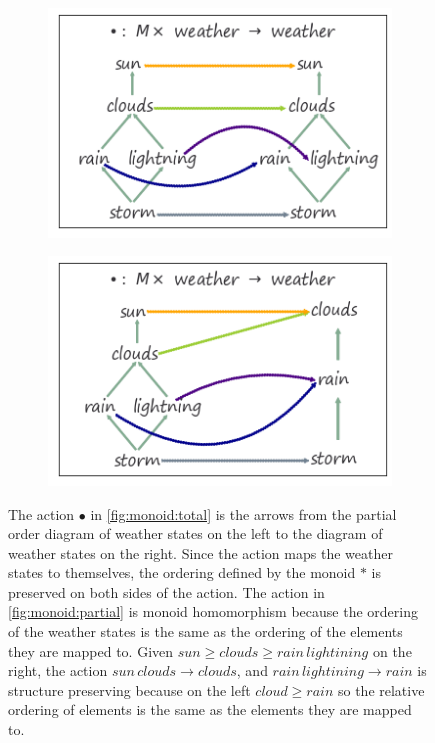\documentclass[../main.tex]{subfiles}
\begin{document}
\begin{figure}[H]
    \begin{subfigure}{.5\textwidth}
        \includegraphics[width=\textwidth]{figures/math/monoid_total.png}
        \caption{}
        \label{fig:math:data:monoid:total}
    \end{subfigure}
    \begin{subfigure}{.5\textwidth}
        \includegraphics[width=1\textwidth]{figures/math/monoid_partial.png}
        \caption{}
        \label{fig:math:data:monoid:partial}
    \end{subfigure}
    \caption{The action $\bullet$ in \autoref{fig:monoid:total} is the arrows from the partial order diagram of weather states on the left to the diagram of weather states on the right. Since the action maps the weather states to themselves, the ordering defined by the monoid $\ast$ is preserved on both sides of the action. The action in \autoref{fig:monoid:partial} is monoid homomorphism because the ordering of the weather states is the same as the ordering of the elements they are mapped to. Given $sun \geq clouds\geq rain\, lightining$ on the right, the action  $sun\, clouds \rightarrow clouds$, and $rain\, lightining \rightarrow rain$ is structure preserving because on the left $cloud \geq rain$ so the relative ordering of elements is the same as the elements they are mapped to.}
    \label{fig:math:data:monoid}
\end{figure}
\end{document}
